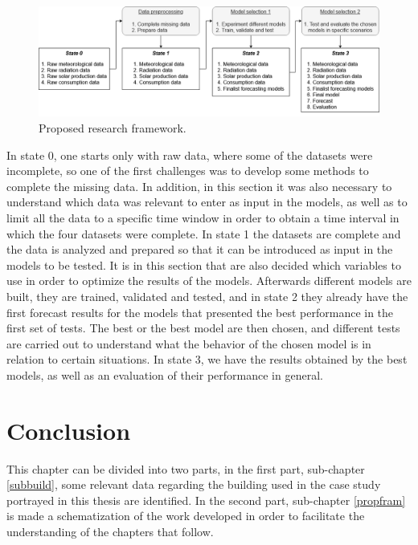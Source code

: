 \begin{figure}[h!]
    \centering
    \begin{center}
    \includegraphics[width=1\textwidth]{Images/framework.png}
    \caption{Proposed research framework.}
    \label{framework}
    \end{center}
\end{figure}

In state 0, one starts only with raw data, where some of the datasets were incomplete, so one of the first challenges was to develop some methods to complete the missing data. In addition, in this section it was also necessary to understand which data was relevant to enter as input in the models, as well as to limit all the data to a specific time window in order to obtain a time interval in which the four datasets were complete. In state 1 the datasets are complete and the data is analyzed and prepared so that it can be introduced as input in the models to be tested. It is in this section that are also decided which variables to use in order to optimize the results of the models. Afterwards different models are built, they are trained, validated and tested, and in state 2 they already have the first forecast results for the models that presented the best performance in the first set of tests. The best or the best model are then chosen, and different tests are carried out to understand what the behavior of the chosen model is in relation to certain situations. In state 3, we have the results obtained by the best models, as well as an evaluation of their performance in general.

\section{Conclusion}

This chapter can be divided into two parts, in the first part, sub-chapter \ref{subbuild}, some relevant data regarding the building used in the case study portrayed in this thesis are identified. In the second part, sub-chapter \ref{propfram} is made a schematization of the work developed in order to facilitate the understanding of the chapters that follow.